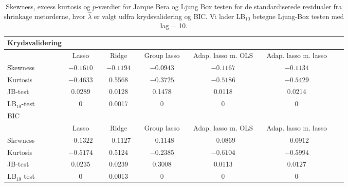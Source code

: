 \begin{sidewaystable} 
\center
\begin{tabular}{lccccccccccc} 
Krydsvalidering\\
\toprule
& Lasso && Ridge  && Group lasso  && Adap. lasso m. OLS  && Adap. lasso m. lasso \\ \midrule
Skewness & $-0.1610$ &&$-0.1194$ && $-0.0943$ & &   $-0.1167$ && $-0.1134$  \\
Kurtosis & $ -0.4633 $ && 0.5568 &&  $-0.3725$ &&    $-0.5186$ && $-0.5429$ \\
JB-test & 0.0289 && 0.0128 &&  0.1478  &&  0.0118 &&  0.0214 \\
LB$_{10}$-test &  0  && 0.0017 && 0  &&  0&  & 0  \\ \bottomrule \toprule
BIC\\ \midrule
& Lasso && Ridge &&Group lasso &  & Adap. lasso m. OLS && Adap. lasso m. lasso  \\ \midrule
Skewness &$-0.1322$ && $-0.1127$ && $-0.1148$ & & $-0.0869$ && $-0.0912$ \\
Kurtosis & $-0.5174$ && 0.5124 &&$-0.2385$ && $-0.6104$ && $-0.5994$\\
JB-test & 0.0235 && 0.0239 && 0.3008   &&   0.0113 &&$0.0127$\\
LB$_{10}$-test & 0 &&  0.0013 && 0  &  & 0 &&  0 \\  \bottomrule
 \end{tabular}
\caption{Skewness, excess kurtosis og \(p\)-værdier for Jarque Bera og Ljung Box testen for de standardiserede residualer fra shrinkage metorderne, hvor $\widehat{\lambda}$ er valgt udfra krydsvalidering og BIC. Vi lader LB$_{10}$ betegne Ljung-Box testen med lag = 10. } \label{tab:res_shrinkage_tab}
\end{sidewaystable}
